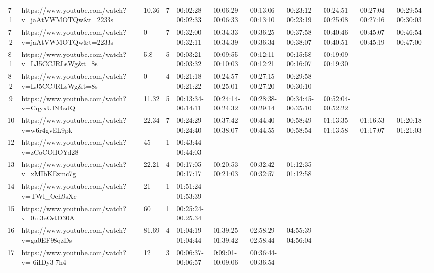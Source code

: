 \begin{landscape}
\begin{table}[!htb]
{\begin{tabular}{|c|p{10cm}|p{1.2cm}|c|p{2.8cm}|p{2.8cm}|p{2.8cm}|p{2.8cm}|p{2.8cm}|p{2.8cm}|p{2.8cm}|}
        \rowcolor{gray!10}
        7-1 & https://www.youtube.com/watch?v=jaAtVWMOTQw\&t=2233s & 10.36 & 7 & 00:02:28-00:02:33 & 00:06:29-00:06:33 & 00:13:06-00:13:10 & 00:23:12-00:23:19 & 00:24:51-00:25:08 & 00:27:04-00:27:16 & 00:29:54-00:30:03  \\ 
        7-2 & https://www.youtube.com/watch?v=jaAtVWMOTQw\&t=2233s & 0 & 7 & 00:32:00-00:32:11 & 00:34:33-00:34:39 & 00:36:25-00:36:34 & 00:37:58-00:38:07 & 00:40:46-00:40:51 & 00:45:07-00:45:19 & 00:46:54-00:47:00  \\ 
        \rowcolor{gray!10}
        8-1 & https://www.youtube.com/watch?v=LJ5CCJRLsWg\&t=8s & 5.8 & 5 & 00:03:21-00:03:32 & 00:09:55-00:10:03 & 00:12:11-00:12:21 & 00:15:58-00:16:07 & 00:19:09-00:19:30 & ~ &   \\ 
        8-2 & https://www.youtube.com/watch?v=LJ5CCJRLsWg\&t=8s & 0 & 4 & 00:21:18-00:21:22 & 00:24:57-00:25:01 & 00:27:15-00:27:20 & 00:29:58-00:30:10 & ~ & ~ &   \\ 
        \rowcolor{gray!10}
        9 & https://www.youtube.com/watch?v=CqyxUIN4zdQ & 11.32 & 5 & 00:13:34-00:14:11 & 00:24:14-00:24:32 & 00:28:38-00:29:14 & 00:34:45-00:35:10 & 00:52:04-00:52:22 & ~ &   \\ 
        10 & https://www.youtube.com/watch?v=w6r4gvEL9pk & 22.34 & 7 & 00:24:29-00:24:40 & 00:37:42-00:38:07 & 00:44:40-00:44:55 & 00:58:49-00:58:54 & 01:13:35-01:13:58 & 01:16:53-01:17:07 & 01:20:18-01:21:03  \\ 
        \rowcolor{gray!10}
        12 & https://www.youtube.com/watch?v=zCoCOHOYd28 & 45 & 1 & 00:43:44-00:44:03 & ~ & ~ & ~ & ~ & ~ &   \\ 
        13 & https://www.youtube.com/watch?v=xMIbKEzmc7g & 22.21 & 4 & 00:17:05-00:17:17 & 00:20:53-00:21:03 & 00:32:42-00:32:57 & 01:12:35-01:12:58 & ~ & ~ &   \\ 
        \rowcolor{gray!10}
        14 & https://www.youtube.com/watch?v=TWl\_Oeh9sXc & 21 & 1 & 01:51:24-01:53:39 & ~ & ~ & ~ & ~ & ~ &   \\ 
        15 & https://www.youtube.com/watch?v=0m3eOstD30A & 60 & 1 & 00:25:24-00:25:34 & ~ & ~ & ~ & ~ & ~ &   \\ 
        \rowcolor{gray!10}
        16 & https://www.youtube.com/watch?v=ga0EF98qzDs & 81.69 & 4 & 01:04:19-01:04:44 & 01:39:25-01:39:42 & 02:58:29-02:58:44 & 04:55:39-04:56:04 & ~ & ~ &   \\ 
        17 & https://www.youtube.com/watch?v=-6iIDy3-7h4 & 12 & 3 & 00:06:37-00:06:57 & 0:09:01-00:09:06 & 00:36:44-00:36:54 & ~ & ~ & ~ &   \\ 

\end{tabular}}
\end{table}
\end{landscape}
